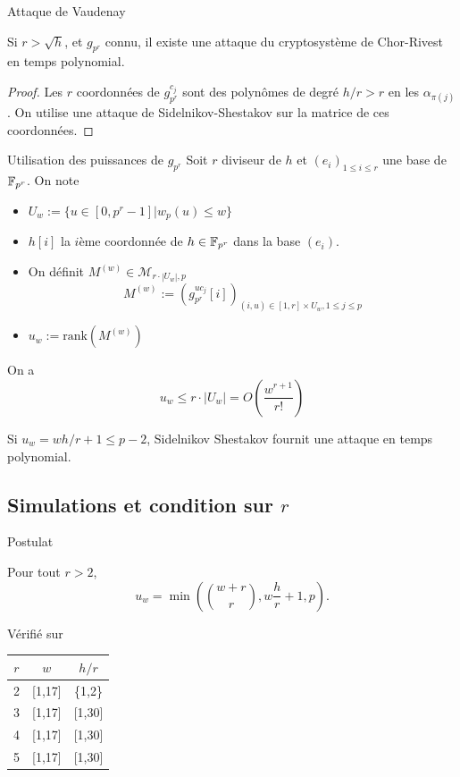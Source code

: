 \documentclass[]{beamer}
\begin{document}
\begin{frame}{Attaque de Vaudenay}
\begin{theorem}
Si $r > \sqrt{h}$, et $g_{p^r}$ connu, il existe une attaque du cryptosystème de Chor-Rivest en temps polynomial.
\end{theorem}
\begin{proof}
Les $r$ coordonnées de $g_{p^r}^{c_j}$ sont des polynômes de degré $h/r > r$ en les $\alpha_{\pi(j)}$.
On utilise une attaque de Sidelnikov-Shestakov sur la matrice de ces coordonnées.
\end{proof}
\end{frame}


\begin{frame}{Utilisation des puissances de $g_{p^r}$}
Soit $r$ diviseur de $h$ et $(e_i)_{1 \leq i \leq r}$ une base de $\mathbb{F}_{p^r}$. On note
\begin{itemize}
\item $ U_w := \{ u \in [0,p^r-1] | w_p(u) \leq w \} $
\item $h[i]$ la $i$ème coordonnée de $h \in \mathbb{F}_{p^r}$ dans la base $(e_i)$.
\item On définit $M^{(w)} \in \mathcal{M}_{r \cdot |U_w|, p}$
$$ M^{(w)} := \left(g_{p^r}^{uc_j}[i] \right)_{(i,u) \in [1,r] \times U_w , 1 \leq j \leq p}$$
\item $u_w := \text{rank} \left( M^{(w)} \right)$
\end{itemize}
On a
$$ u_w \leq r \cdot |U_w| = O\left( \frac{w^{r+1}}{r!} \right) $$

\begin{theorem}
Si $u_w = wh/r+1 \leq p-2$, Sidelnikov Shestakov fournit une attaque en temps polynomial.
\end{theorem}

\end{frame}


\subsection{Simulations et condition sur $r$}
\begin{frame}{Postulat}

\begin{postulate}
Pour tout $r > 2$,
$$ u_w = \min \left( \binom{w+r}{r}, w\frac{h}{r} + 1 , p \right).$$
\end{postulate}
Vérifié sur
\begin{center}
\begin{tabular}{|c|c|c|}
\hline
$r$ & $w$ 	& $h/r$ \\
\hline
2	& [1,17]	& \{1,2\}	\\
\hline
3	& [1,17]	& [1,30] \\
\hline
4	& [1,17]	& [1,30] \\
\hline
5	& [1,17]	& [1,30] \\
\hline
\end{tabular}
\end{center}
\end{frame}
\end{document}
